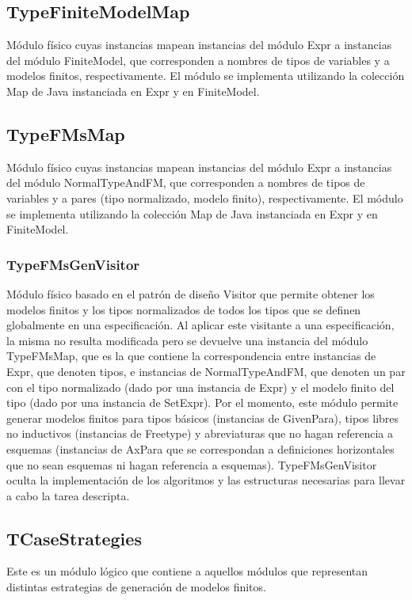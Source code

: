 \documentclass[a4paper,10pt]{report}
\begin{document}
			\subsection{TypeFiniteModelMap}
			Módulo físico cuyas instancias mapean instancias del módulo Expr a instancias del módulo FiniteModel, que corresponden a nombres de tipos de variables y a modelos finitos, respectivamente. El módulo se implementa utilizando la colección Map de Java instanciada en Expr y en FiniteModel.
			\subsection{TypeFMsMap}
			Módulo físico cuyas instancias mapean instancias del módulo Expr a instancias del módulo NormalTypeAndFM, que corresponden a nombres de tipos de variables y a pares (tipo normalizado, modelo finito), respectivamente. El módulo se implementa utilizando la colección Map de Java instanciada en Expr y en FiniteModel.
			\subsubsection{TypeFMsGenVisitor}
			Módulo físico basado en el patrón de diseño Visitor que permite obtener los modelos finitos y los tipos normalizados de todos los tipos que se definen globalmente en una especificación. Al aplicar este visitante a una especificación, la misma no resulta modificada pero se devuelve una instancia del módulo TypeFMsMap, que es la que contiene la correspondencia entre instancias de Expr, que denoten tipos, e instancias de NormalTypeAndFM, que denoten un par con el tipo normalizado (dado por una instancia de Expr) y el modelo finito del tipo (dado por una instancia de SetExpr). Por el momento, este módulo permite generar modelos finitos para tipos básicos (instancias de GivenPara), tipos libres no inductivos (instancias de Freetype) y abreviaturas que no hagan referencia a esquemas (instancias de AxPara que se correspondan a definiciones horizontales que no sean esquemas ni hagan referencia a esquemas). TypeFMsGenVisitor oculta la implementación de los algoritmos y las estructuras necesarias para llevar a cabo la tarea descripta.
		\subsection{TCaseStrategies}
		Este es un módulo lógico que contiene a aquellos módulos que representan distintas estrategias de generación de modelos finitos.
\end{document}
